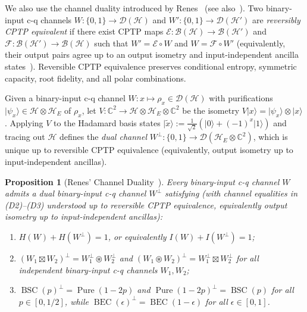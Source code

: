 \documentclass[10pt,a4paper]{article}
\numberwithin{equation}{section}
\theoremstyle{plain}
\newtheorem{proposition}[theorem]{Proposition}
\theoremstyle{definition}
\theoremstyle{remark}
\DeclareMathOperator{\BSC}{BSC}
\DeclareMathOperator{\BEC}{BEC}
\DeclareMathOperator{\Pure}{Pure}
\newcommand{\cH}{\mathcal{H}}
\newcommand{\cD}{\mathcal{D}}
\newcommand{\cB}{\mathcal{B}}
\newcommand{\cE}{\mathcal{E}}
\newcommand{\cF}{\mathcal{F}}
\newcommand{\bC}{\mathbb{C}}
\newcommand{\ket}[1]{\lvert #1 \rangle}
\begin{document}
We also use the channel duality introduced by Renes~\cite{Renes2018} (see also~\cite[Section~IV-A]{HircheReeb2018}). Two binary-input c-q channels $W : \{0,1\} \to \cD(\cH)$ and $W' : \{0,1\} \to \cD(\cH')$ are \emph{reversibly CPTP equivalent} if there exist CPTP maps $\cE : \cB(\cH) \to \cB(\cH')$ and $\cF : \cB(\cH') \to \cB(\cH)$ such that $W' = \cE \circ W$ and $W = \cF \circ W'$ (equivalently, their output pairs agree up to an output isometry and input-independent ancilla states~\cite{Renes2018}). Reversible CPTP equivalence preserves conditional entropy, symmetric capacity, root fidelity, and all polar combinations.

Given a binary-input c-q channel $W : x \mapsto \rho_x \in \cD(\cH)$ with purifications $\ket{\psi_x} \in \cH \otimes \cH_E$ of $\rho_x$, let $V : \bC^2 \to \cH \otimes \cH_E \otimes \bC^2$ be the isometry $V\ket{x} = \ket{\psi_x} \otimes \ket{x}$. Applying $V$ to the Hadamard basis states $\ket{\tilde{x}} := \frac{1}{\sqrt{2}}(\ket{0} + (-1)^x \ket{1})$ and tracing out $\cH$ defines the \emph{dual channel} $W^{\perp} : \{0,1\} \to \cD(\cH_E \otimes \bC^2)$, which is unique up to reversible CPTP equivalence (equivalently, output isometry up to input-independent ancillas).

\begin{proposition}[Renes' Channel Duality~\cite{Renes2018}]\label{prop:duality}
Every binary-input c-q channel $W$ admits a dual binary-input c-q channel $W^{\perp}$ satisfying (with channel equalities in \textup{(D2)--(D3)} understood up to reversible CPTP equivalence, equivalently output isometry up to input-independent ancillas):
\begin{enumerate}
\item[\textup{(D1)}] $H(W) + H(W^{\perp}) = 1$, or equivalently $I(W) + I(W^{\perp}) = 1$;
\item[\textup{(D2)}] $(W_1 \boxtimes W_2)^{\perp} = W_1^{\perp} \circledast W_2^{\perp}$ and $(W_1 \circledast W_2)^{\perp} = W_1^{\perp} \boxtimes W_2^{\perp}$ for all independent binary-input c-q channels $W_1, W_2$;
\item[\textup{(D3)}] $\BSC(p)^{\perp} = \Pure(1 - 2p)$ and $\Pure(1 - 2p)^{\perp} = \BSC(p)$ for all $p \in [0, 1/2]$, while $\BEC(\epsilon)^{\perp} = \BEC(1 - \epsilon)$ for all $\epsilon \in [0, 1]$.
\end{enumerate}
\end{proposition}
\end{document}
